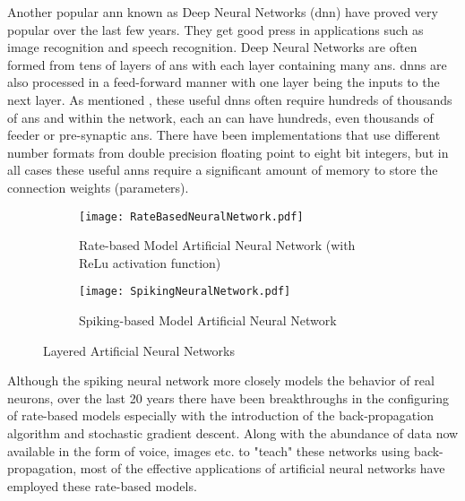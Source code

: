Another popular \ac{ann} known as Deep Neural Networks (\ac{dnn}) have proved very popular over the last few years. They get good press in applications such as image recognition and speech recognition. 
Deep Neural Networks are often formed from tens of layers of \ac{an}s with each layer containing many \ac{an}s. \ac{dnn}s are also processed in a feed-forward manner with one layer being the inputs to the next layer. 
As mentioned \cite{krizhevsky2012imagenet}, these useful \ac{dnn}s often require hundreds of thousands of \ac{an}s and within the network, each \ac{an} can have hundreds, even thousands of feeder or pre-synaptic \ac{an}s.
There have been implementations that use different number formats from double precision floating point to eight bit integers, but in all cases these useful \ac{ann}s require a significant amount of memory to store the connection weights (parameters).


\begin{figure}[!t]
  \centering
  \captionsetup{justification=centering}
  \captionsetup{width=.9\linewidth}
  \begin{subfigure}{.9\textwidth}
    \centerline{
    \mbox{\texttt{[image: RateBasedNeuralNetwork.pdf]}}
    }
    \caption{Rate-based Model Artificial Neural Network (with ReLu activation function)}
    \label{fig:Rate-based Model Network}
  \end{subfigure}
  
  \begin{subfigure}{.9\textwidth}
    \centerline{
    \mbox{\texttt{[image: SpikingNeuralNetwork.pdf]}}
    }
    \caption{Spiking-based Model Artificial Neural Network}
    \label{fig:Spiking Model Network}
  \end{subfigure}
  \caption{Layered Artificial Neural Networks}
  \label{Example Artificial Neural Networks}
\end{figure}

Although the spiking neural network more closely models the behavior of real neurons, over the last 20 years there 
have been breakthroughs in the configuring of rate-based models especially with the introduction of the back-propagation
algorithm and stochastic gradient descent. Along with the abundance of data now available in the form of voice, images etc. to "teach" these networks
using back-propagation, most of the effective applications of artificial neural networks have employed these rate-based models.

\iffalse
Our research will focus on these rate-based models which we will now refer to as \ac{ann}s.
\fi


